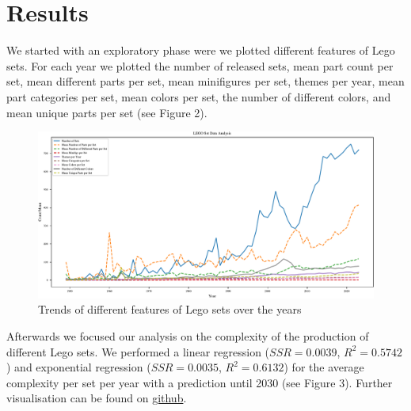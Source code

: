 \documentclass{article}
\theoremstyle{plain}
\theoremstyle{definition}
\theoremstyle{remark}
\begin{document}
\section{Results}\label{sec:results}
We started with an exploratory phase were we plotted different features of Lego sets. For each year we plotted the number of released sets, mean part count per set, mean different parts per set, mean minifigures per set, themes per year, mean part categories per set, mean colors per set, the number of different colors, and mean unique parts per set (see Figure 2).

\begin{figure}[ht]
 \vskip 0.2in
 \begin{center}
 \centerline{\includegraphics[width=\columnwidth]{Images/Exploration.pdf}}
\caption{Trends of different features of Lego sets over the years}
\label{icml-historical}
 \end{center}
 \vskip -0.2in
\end{figure}

Afterwards we focused our analysis on the complexity of the production of different Lego sets. We performed a linear regression ($SSR = 0.0039$, $R^2= 0.5742$) and exponential regression ($SSR = 0.0035$, $R^2= 0.6132$) for the average complexity per set per year with a prediction until 2030 (see Figure 3). Further visualisation can be found on \href{https://github.com/eddiebeach99/Data_Literacy/blob/main/Analysis/complexity_regression.ipynb}{github}.
\end{document}
